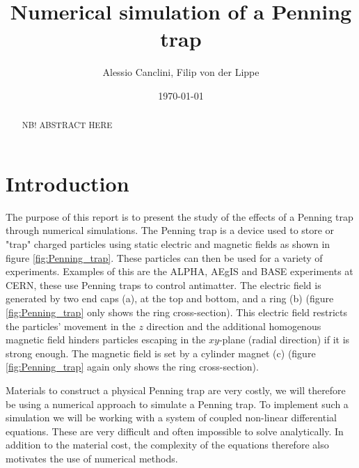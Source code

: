 \documentclass[english,notitlepage,reprint,nofootinbib]{revtex4-1}  %
\begin{document}

\title{Numerical simulation of a Penning trap}  %
\author{Alessio Canclini, Filip von der Lippe} %
\date{\today}                             %
\noaffiliation                            %

\begin{abstract}
    NB! ABSTRACT HERE
\end{abstract}
\maketitle


\section{Introduction}
The purpose of this report is to present the study of the effects of a Penning trap through numerical simulations. The Penning trap is a device used to store or "trap" charged particles
using static electric and magnetic fields as shown in figure \ref{fig:Penning_trap}. These particles can then be used for a variety of experiments. Examples of this are the ALPHA, AEgIS and BASE
experiments at CERN, these use Penning traps to control antimatter.
The electric field is generated by two end caps (a), at the top and bottom,
and a ring (b) (figure \ref{fig:Penning_trap} only shows the ring cross-section).
This electric field restricts the particles' movement in the $z$ direction and the additional homogenous magnetic field
hinders particles escaping in the $xy$-plane (radial direction) if it is strong enough. The magnetic field is set by
a cylinder magnet (c) (figure \ref{fig:Penning_trap} again only shows the ring cross-section).

Materials to construct a physical Penning trap are very costly, we will therefore
be using a numerical approach to simulate a Penning trap. To implement such a simulation
we will be working with a system of coupled non-linear differential equations. These are very
difficult and often impossible to solve analytically. %
In addition to the
material cost, the complexity of the equations therefore also motivates the use of numerical methods.
\end{document}
